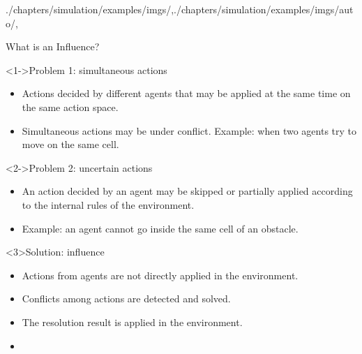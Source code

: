 \begin{graphicspathcontext}{{./chapters/simulation/examples/imgs/},{./chapters/simulation/examples/imgs/auto/},\old}
\begin{frame}[t]{{What is an} Influence?}
	\vspace{-.25cm}
	\smaller
	\begin{alertblock}<1->{Problem 1: simultaneous actions}
		\begin{itemize}
		\item Actions decided by different agents that may be applied at the same time on the same action space.
		\item Simultaneous actions may be under conflict. Example: when two agents try to move on the same cell.
		\end{itemize}
	\end{alertblock}
	\vspace{-.25em}
	\begin{alertblock}<2->{Problem 2: uncertain actions}
		\begin{itemize}
		\item An action decided by an agent may be skipped or partially applied according to the internal rules of the environment.
		\item Example: an agent cannot go inside the same cell of an obstacle.
		\end{itemize}
	\end{alertblock}
	\vspace{-.25em}
	\begin{block}{Solution: influence}
		\begin{itemize}
		\item Actions from agents are not directly applied in the environment.
		\item Conflicts among actions are detected and solved.
		\item The resolution result is applied in the environment.
		\item {}
		\end{itemize}
	\end{block}
\end{frame}


\end{graphicspathcontext}
